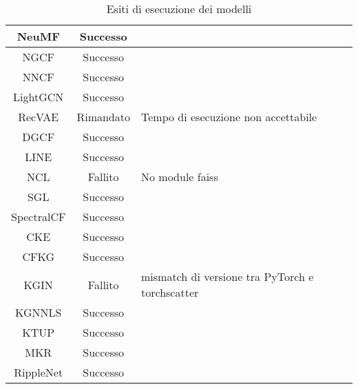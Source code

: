 \begin{table}[H]
\begin{tabularx}{\textwidth}{|c|c|X|}
        \hline
        NeuMF & Successo &  \\
        \hline
        NGCF & Successo &  \\
        \hline
        NNCF & Successo &  \\
        \hline
        LightGCN & Successo &  \\
        \hline
        RecVAE & Rimandato & Tempo di esecuzione non accettabile \\
        \hline
        DGCF & Successo &  \\
        \hline
        LINE & Successo &  \\
        \hline
        NCL & Fallito & No module faiss \\
        \hline
        SGL & Successo & \\
        \hline
        SpectralCF & Successo &  \\
        \hline
        CKE & Successo &  \\
        \hline
        CFKG & Successo &  \\
        \hline
        KGIN & Fallito & mismatch di versione tra PyTorch e torch\-scatter \\
        \hline
        KGNNLS & Successo &  \\
        \hline
        KTUP & Successo &  \\
        \hline
        MKR & Successo &  \\
        \hline
        RippleNet & Successo &  \\
        \hline
    \end{tabularx}
    \caption{Esiti di esecuzione dei modelli}
    \label{tab:dataset_info}
\end{table}


